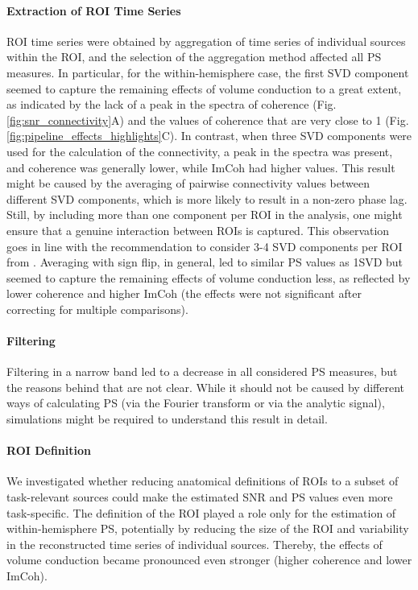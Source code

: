 \paragraph{Extraction of ROI Time Series}

ROI time series were obtained by aggregation of time series of individual sources within the ROI, and the selection of the aggregation method affected all PS measures. In particular, for the within-hemisphere case, the first SVD component seemed to capture the remaining effects of volume conduction to a great extent, as indicated by the lack of a peak in the spectra of coherence (Fig. \ref{fig:snr_connectivity}A) and the values of coherence that are very close to 1 (Fig. \ref{fig:pipeline_effects_highlights}C). In contrast, when three SVD components were used for the calculation of the connectivity, a peak in the spectra was present, and coherence was generally lower, while ImCoh had higher values. This result might be caused by the averaging of pairwise connectivity values between different SVD components, which is more likely to result in a non-zero phase lag. Still, by including more than one component per ROI in the analysis, one might ensure that a genuine interaction between ROIs is captured. This observation goes in line with the recommendation to consider 3-4 SVD components per ROI from \citep{Pellegrini2023}. Averaging with sign flip, in general, led to similar PS values as 1SVD but seemed to capture the remaining effects of volume conduction less, as reflected by lower coherence and higher ImCoh (the effects were not significant after correcting for multiple comparisons).

\paragraph{Filtering}

Filtering in a narrow band led to a decrease in all considered PS measures, but the reasons behind that are not clear. While it should not be caused by different ways of calculating PS (via the Fourier transform or via the analytic signal), simulations might be required to understand this result in detail.

\paragraph{ROI Definition}

We investigated whether reducing anatomical definitions of ROIs to a subset of task-relevant sources could make the estimated SNR and PS values even more task-specific. The definition of the ROI played a role only for the estimation of within-hemisphere PS, potentially by reducing the size of the ROI and variability in the reconstructed time series of individual sources. Thereby, the effects of volume conduction became pronounced even stronger (higher coherence and lower ImCoh).

